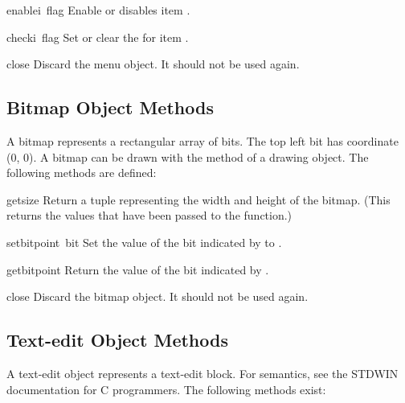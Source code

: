 \begin{funcdesc}{enable}{i\, flag}
Enable or disables item
.
\end{funcdesc}

\begin{funcdesc}{check}{i\, flag}
Set or clear the
for item
.
\end{funcdesc}

\begin{funcdesc}{close}{}
Discard the menu object.  It should not be used again.
\end{funcdesc}

\subsection{Bitmap Object Methods}

A bitmap represents a rectangular array of bits.
The top left bit has coordinate (0, 0).
A bitmap can be drawn with the  method of a drawing object.
The following methods are defined:

\renewcommand{\indexsubitem}{(bitmap method)}

\begin{funcdesc}{getsize}{}
Return a tuple representing the width and height of the bitmap.
(This returns the values that have been passed to the 
function.)
\end{funcdesc}

\begin{funcdesc}{setbit}{point\, bit}
Set the value of the bit indicated by  to .
\end{funcdesc}

\begin{funcdesc}{getbit}{point}
Return the value of the bit indicated by .
\end{funcdesc}

\begin{funcdesc}{close}{}
Discard the bitmap object.  It should not be used again.
\end{funcdesc}

\subsection{Text-edit Object Methods}

A text-edit object represents a text-edit block.
For semantics, see the STDWIN documentation for C programmers.
The following methods exist:

